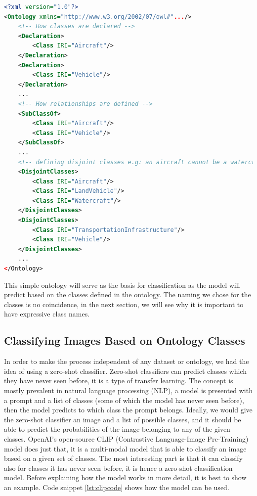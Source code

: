 \documentclass[a4paper,11pt,oneside]{article}
\begin{document}
  \begin{lstlisting}[language=XML, caption={OWL expressed in XML code for the ontology},label={lst:ontologycode}, mathescape=true, breaklines=true]
<?xml version="1.0"?>
<Ontology xmlns="http://www.w3.org/2002/07/owl#".../>
	<!-- How classes are declared -->
    <Declaration> 
        <Class IRI="Aircraft"/>
    </Declaration>
    <Declaration>
        <Class IRI="Vehicle"/>
    </Declaration>
    ...
    <!-- How relationships are defined -->
    <SubClassOf>
        <Class IRI="Aircraft"/>
        <Class IRI="Vehicle"/>
    </SubClassOf>
    ...
    <!-- defining disjoint classes e.g: an aircraft cannot be a watercraft or a land vehicle, a vehicle cannot be a transport infrastructure ... -->
    <DisjointClasses>
        <Class IRI="Aircraft"/>
        <Class IRI="LandVehicle"/>
        <Class IRI="Watercraft"/>
    </DisjointClasses>
    <DisjointClasses>
        <Class IRI="TransportationInfrastructure"/>
        <Class IRI="Vehicle"/>
    </DisjointClasses>
    ...
</Ontology>
  \end{lstlisting}
  This simple ontology will serve as the basis for classification as the model will predict based on the classes defined in the ontology. The naming we chose for the classes is no coincidence, in the next section, we will see why it is important to have expressive class names.
  
  \subsection{Classifying Images Based on Ontology Classes}
  In order to make the process independent of any dataset or ontology, we had the idea of using a zero-shot classifier. Zero-shot classifiers can predict classes which they have never seen before, it is a type of transfer learning. The concept is mostly prevalent in natural language processing (NLP), a model is presented with a prompt and a list of classes (some of which the model has never seen before), then the model predicts to which class the prompt belongs. Ideally, we would give the zero-shot classifier an image and a list of possible classes, and it should be able to predict the probabilities of the image belonging to any of the given classes. OpenAI's open-source CLIP \cite{radford2021learning}(Contrastive Language-Image Pre-Training) model does just that, it is a multi-modal model that is able to classify an image based on a given set of classes. The most interesting part is that it can classify also for classes it has never seen before, it is hence a zero-shot classification model. Before explaining how the model works in more detail, it is best to show an example. Code snippet \ref{lst:clipcode} shows how the model can be used.
  
\end{document}
